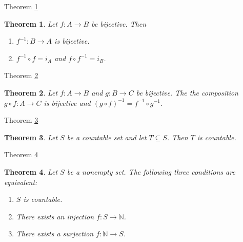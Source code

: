\documentclass[avery5371,grid]{flashcards}
\newtheorem{theorem}{Theorem}
\newcommand{\bb}[1]{\mathbb{#1}}
\newcommand{\N}{\bb{N}}
\begin{document}
\begin{flashcard}[Theorem]{Theorem \ref{thm13}}
\begin{theorem}
\label{thm13}
Let $f: A \to B$ be bijective.  Then
\begin{enumerate}
\item $f^{-1}: B \to A$ is bijective.
\item $f^{-1} \circ f = i_A$ and $f \circ f^{-1} = i_B$.
\end{enumerate}
\end{theorem}
\end{flashcard}

\begin{flashcard}[Theorem]{Theorem \ref{thm14}}
\begin{theorem}
\label{thm14}
Let $f: A \to B$ and $g: B \to C$ be bijective.  The the composition
$g \circ f : A \to C$ is bijective and
$(g \circ f)^{-1} = f^{-1} \circ g^{-1}$.
\end{theorem}
\end{flashcard}

\begin{flashcard}[Theorem]{Theorem \ref{thm15}}
\begin{theorem}
\label{thm15}
Let $S$ be a countable set and let $T \subseteq S$.  Then $T$ is countable.
\end{theorem}
\end{flashcard}


\begin{flashcard}[Theorem]{Theorem \ref{thm16}}
\begin{theorem}
\label{thm16}
Let $S$ be a nonempty set.  The following three conditions are
equivalent:
\begin{enumerate}
\item $S$ is countable.
\item There exists an injection $f: S \to \N$.
\item There exists a surjection $f: \N \to S$.
\end{enumerate}
\end{theorem}
\end{flashcard}
\end{document}
